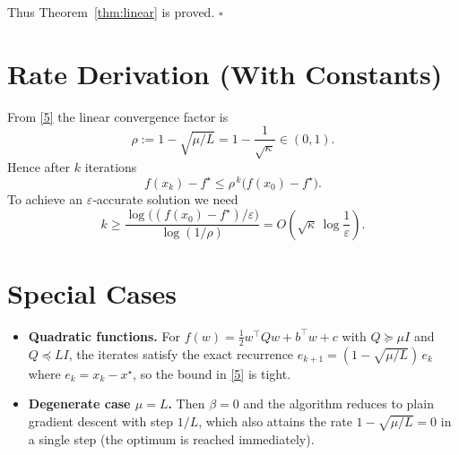 \documentclass{article}
\begin{document}
Thus Theorem~\ref{thm:linear} is proved. \hfill $\square$

\section*{Rate Derivation (With Constants)}
From \eqref{5} the linear convergence factor is
\[
\rho:=1-\sqrt{\mu/L}=1-\frac{1}{\sqrt{\kappa}}\in(0,1).
\]
Hence after $k$ iterations
\[
f(x_{k})-f^{\star}\le \rho^{\,k}\bigl(f(x_{0})-f^{\star}\bigr).
\]
To achieve an $\varepsilon$‑accurate solution we need
\[
k\ge \frac{\log\bigl((f(x_{0})-f^{\star})/\varepsilon\bigr)}
           {\log(1/\rho)}
   = O\!\left(\sqrt{\kappa}\,\log\frac{1}{\varepsilon}\right).
\]

\section*{Special Cases}
\begin{itemize}
    \item \textbf{Quadratic functions.}  For $f(w)=\tfrac12 w^{\top}Qw+b^{\top}w+c$
    with $Q\succeq\mu I$ and $Q\preceq L I$, the iterates satisfy the exact
    recurrence $e_{k+1}= (1-\sqrt{\mu/L})\,e_{k}$ where $e_{k}=x_{k}-x^{\star}$,
    so the bound in \eqref{5} is tight.
    \item \textbf{Degenerate case $\mu=L$.}  Then $\beta=0$ and the algorithm
    reduces to plain gradient descent with step $1/L$, which also attains the
    rate $1-\sqrt{\mu/L}=0$ in a single step (the optimum is reached immediately).
\end{itemize}
\end{document}
